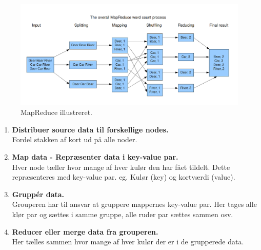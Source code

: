 \begin{figure}[h]
\centering
\includegraphics[width=\linewidth]{figs/reduce}
\caption{MapReduce illustreret.}
\label{fig:reduce}
\end{figure}

\begin{enumerate}
	\item \textbf{Distribuer source data til forskellige nodes.}\\
	Fordel stakken af kort ud på alle noder.
	\item \textbf{Map data - Repræsenter data i key-value par.}\\
	Hver node tæller hvor mange af hver kulør den har fået tildelt. Dette repræsenteres med key-value par. eg. Kulør (key) og kortværdi (value).
	\item \textbf{Gruppér data.} \\
	Grouperen har til ansvar at gruppere mappernes key-value par. Her tages alle klør par og sættes i samme gruppe, alle ruder par sættes sammen osv.
	\item \textbf{Reducer eller merge  data fra grouperen.}\\
	Her tælles sammen hvor mange af hver kulør der er i de grupperede data.
\end{enumerate}
